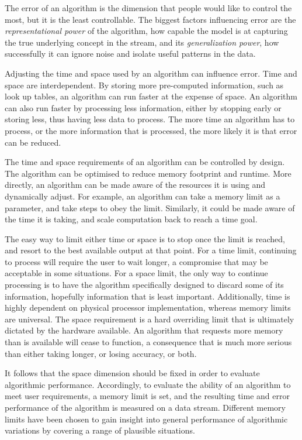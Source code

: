 The error of an algorithm is the dimension that people would like to control the most, but it is the least controllable. The biggest factors influencing error are the {\em representational power} of the algorithm, how capable the model is at capturing the true underlying concept in the stream, and its {\em generalization power}, how successfully it can ignore noise and isolate useful patterns in the data.

Adjusting the time and space used by an algorithm can influence error. Time and space are interdependent. By storing more pre-computed information, such as look up tables, an algorithm can run faster at the expense of space. An algorithm can also run faster by processing less information, either by stopping early or storing less, thus having less data to process. The more time an algorithm has to process, or the more information that is processed, the more likely it is that error can be reduced.

The time and space requirements of an algorithm can be controlled by design. The algorithm can be optimised to reduce memory footprint and runtime. More directly, an algorithm can be made aware of the resources it is using and dynamically adjust. For example, an algorithm can take a memory limit as a parameter, and take steps to obey the limit. Similarly, it could be made aware of the time it is taking, and scale computation back to reach a time goal.

The easy way to limit either time or space is to stop once the limit is reached, and resort to the best available output at that point. For a time limit, continuing to process will require the user to wait longer, a compromise that may be acceptable in some situations. For a space limit, the only way to continue processing is to have the algorithm specifically designed to discard some of its information, hopefully information that is least important.
Additionally, time is highly dependent on physical processor implementation, whereas memory limits are universal.
The space requirement is a hard overriding limit that is ultimately dictated by the hardware available. An algorithm that requests more memory than is available will cease to function, a consequence that is much more serious than either taking longer, or losing accuracy, or both.

It follows that the space dimension should be fixed in order to evaluate algorithmic performance. 
Accordingly, to evaluate the ability of an algorithm to meet user requirements, a memory limit is set, and the resulting time and error performance of the algorithm is measured on a data stream.
Different memory limits have been chosen to gain insight into general performance of algorithmic variations by covering a range of plausible situations.

